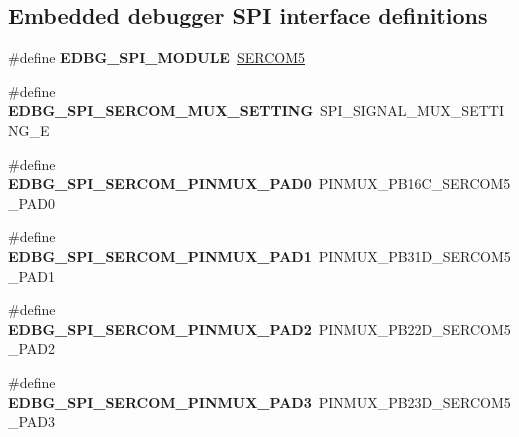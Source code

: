 \subsection*{Embedded debugger S\+P\+I interface definitions}
\begin{DoxyCompactItemize}
\item 
\hypertarget{group__saml21__xplained__pro__features__group_ga10c97c791efe2dd1b4bd8a577f5e0c44}{}\#define {\bfseries E\+D\+B\+G\+\_\+\+S\+P\+I\+\_\+\+M\+O\+D\+U\+L\+E}~\hyperlink{group___s_a_m_l21_j18_a__base_ga8785a316e608cb0a218f2a59655d6037}{S\+E\+R\+C\+O\+M5}\label{group__saml21__xplained__pro__features__group_ga10c97c791efe2dd1b4bd8a577f5e0c44}

\item 
\hypertarget{group__saml21__xplained__pro__features__group_ga038b971af0847e18d7abd8135d0fbab4}{}\#define {\bfseries E\+D\+B\+G\+\_\+\+S\+P\+I\+\_\+\+S\+E\+R\+C\+O\+M\+\_\+\+M\+U\+X\+\_\+\+S\+E\+T\+T\+I\+N\+G}~S\+P\+I\+\_\+\+S\+I\+G\+N\+A\+L\+\_\+\+M\+U\+X\+\_\+\+S\+E\+T\+T\+I\+N\+G\+\_\+\+E\label{group__saml21__xplained__pro__features__group_ga038b971af0847e18d7abd8135d0fbab4}

\item 
\hypertarget{group__saml21__xplained__pro__features__group_gaef3069b7c754477829469c1628d7d1d4}{}\#define {\bfseries E\+D\+B\+G\+\_\+\+S\+P\+I\+\_\+\+S\+E\+R\+C\+O\+M\+\_\+\+P\+I\+N\+M\+U\+X\+\_\+\+P\+A\+D0}~P\+I\+N\+M\+U\+X\+\_\+\+P\+B16\+C\+\_\+\+S\+E\+R\+C\+O\+M5\+\_\+\+P\+A\+D0\label{group__saml21__xplained__pro__features__group_gaef3069b7c754477829469c1628d7d1d4}

\item 
\hypertarget{group__saml21__xplained__pro__features__group_gad5152d1a5c7472c8a49e91446df28219}{}\#define {\bfseries E\+D\+B\+G\+\_\+\+S\+P\+I\+\_\+\+S\+E\+R\+C\+O\+M\+\_\+\+P\+I\+N\+M\+U\+X\+\_\+\+P\+A\+D1}~P\+I\+N\+M\+U\+X\+\_\+\+P\+B31\+D\+\_\+\+S\+E\+R\+C\+O\+M5\+\_\+\+P\+A\+D1\label{group__saml21__xplained__pro__features__group_gad5152d1a5c7472c8a49e91446df28219}

\item 
\hypertarget{group__saml21__xplained__pro__features__group_ga47b3ed0d9a5ec64d1c1b2290bf0c338d}{}\#define {\bfseries E\+D\+B\+G\+\_\+\+S\+P\+I\+\_\+\+S\+E\+R\+C\+O\+M\+\_\+\+P\+I\+N\+M\+U\+X\+\_\+\+P\+A\+D2}~P\+I\+N\+M\+U\+X\+\_\+\+P\+B22\+D\+\_\+\+S\+E\+R\+C\+O\+M5\+\_\+\+P\+A\+D2\label{group__saml21__xplained__pro__features__group_ga47b3ed0d9a5ec64d1c1b2290bf0c338d}

\item 
\hypertarget{group__saml21__xplained__pro__features__group_ga816d37a841e7021dd0e79343e1b933ff}{}\#define {\bfseries E\+D\+B\+G\+\_\+\+S\+P\+I\+\_\+\+S\+E\+R\+C\+O\+M\+\_\+\+P\+I\+N\+M\+U\+X\+\_\+\+P\+A\+D3}~P\+I\+N\+M\+U\+X\+\_\+\+P\+B23\+D\+\_\+\+S\+E\+R\+C\+O\+M5\+\_\+\+P\+A\+D3\label{group__saml21__xplained__pro__features__group_ga816d37a841e7021dd0e79343e1b933ff}


\end{DoxyCompactItemize}
